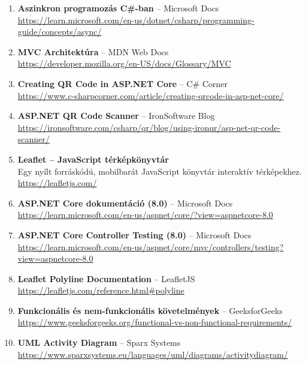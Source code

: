 \begin{enumerate}
    \item \label{ref:async_programozas} \textbf{Aszinkron programozás C\#-ban} – Microsoft Docs\\
    \url{https://learn.microsoft.com/en-us/dotnet/csharp/programming-guide/concepts/async/}

    \item \label{ref:mvc_architektura} \textbf{MVC Architektúra} – MDN Web Docs\\
    \url{https://developer.mozilla.org/en-US/docs/Glossary/MVC}

    \item \label{ref:qr_code} \textbf{Creating QR Code in ASP.NET Core} – C\# Corner\\
    \url{https://www.c-sharpcorner.com/article/creating-qrcode-in-asp-net-core/}

    \item \label{ref:qr_scanner} \textbf{ASP.NET QR Code Scanner} – IronSoftware Blog\\
    \url{https://ironsoftware.com/csharp/qr/blog/using-ironqr/asp-net-qr-code-scanner/}

    \item \label{ref:leaflet} \textbf{Leaflet – JavaScript térképkönyvtár}\\
    Egy nyílt forráskódú, mobilbarát JavaScript könyvtár interaktív térképekhez.\\
    \url{https://leafletjs.com/}

    \item \label{ref:aspnet_core_docs} \textbf{ASP.NET Core dokumentáció (8.0)} – Microsoft Docs\\
    \url{https://learn.microsoft.com/en-us/aspnet/core/?view=aspnetcore-8.0}

    \item \label{ref:controller_testing} \textbf{ASP.NET Core Controller Testing (8.0)} – Microsoft Docs\\
    \url{https://learn.microsoft.com/en-us/aspnet/core/mvc/controllers/testing?view=aspnetcore-8.0}
    
    \item \label{ref:leaflet_polyline_docs} \textbf{Leaflet Polyline Documentation} – LeafletJS\\
    \url{https://leafletjs.com/reference.html#polyline}
    
    \item \label{ref:func_vs_nonfunc} \textbf{Funkcionális és nem-funkcionális követelmények} – GeeksforGeeks\\
    \url{https://www.geeksforgeeks.org/functional-vs-non-functional-requirements/}

    \item \label{ref:uml_activity} \textbf{UML Activity Diagram} – Sparx Systems\\
    \url{https://www.sparxsystems.eu/languages/uml/diagrams/activitydiagram/}

\end{enumerate}
